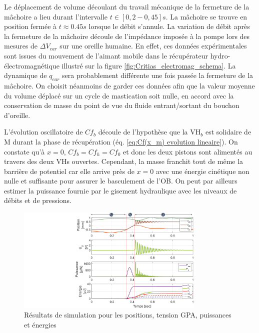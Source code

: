 Le déplacement de volume découlant du travail mécanique de la fermeture de la mâchoire a lieu durant l'intervalle $t\in [0,2 - 0,45]s$. La mâchoire se trouve en position fermée à $t\approx 0.45s$ lorsque le débit s'annule. La variation de débit après la fermeture de la mâchoire découle de l'impédance imposée à la pompe lors des mesures de $\Delta V_{ear}$ sur une oreille humaine. En effet, ces données expérimentales sont issues du mouvement de l'aimant mobile dans le récupérateur hydro-électromagnétique illustré sur la figure \ref{fig:Critias_electromag_schema}. La dynamique de $q_{ear}$ sera probablement différente une fois passée la fermeture de la mâchoire. On choisit néanmoins de garder ces données afin que la valeur moyenne du volume déplacé sur un cycle de mastication soit nulle, en accord avec la conservation de masse du point de vue du fluide entrant/sortant du bouchon d'oreille. 

L'évolution oscillatoire de $Cf_b$ découle de l'hypothèse que la VH$_b$ est solidaire de M durant la phase de récupération (éq. \ref{eq:Cf(x_m) evolution lineaire}). On constate qu'à $x=0$, $Cf_b = Cf_h = Cf_0$ et donc les deux pistons sont alimentés au travers des deux VHs ouvertes. Cependant, la masse franchit tout de même la barrière de potentiel car elle arrive près de $x=0$ avec une énergie cinétique non nulle et suffisante pour assurer le basculement de l'OB. On peut par ailleurs estimer la puissance fournie par le gisement hydraulique avec les niveaux de débits et de pressions.  
\begin{figure}[!h]
\begin{center}
    \captionsetup{justification=centering}
	\includegraphics[trim={10cm 0cm 0cm 0cm},clip,width=0.8\textwidth]{../Chap2/Figure/simu_pos_Up_puissances_energie_1CYCLE.pdf}
	\caption{Résultats de simulation pour les positions, tension GPA, puissances et énergies}
	\label{fig:simu_pos_Up_puissances_energie_1CYCLE}
\end{center}	
\end{figure}

